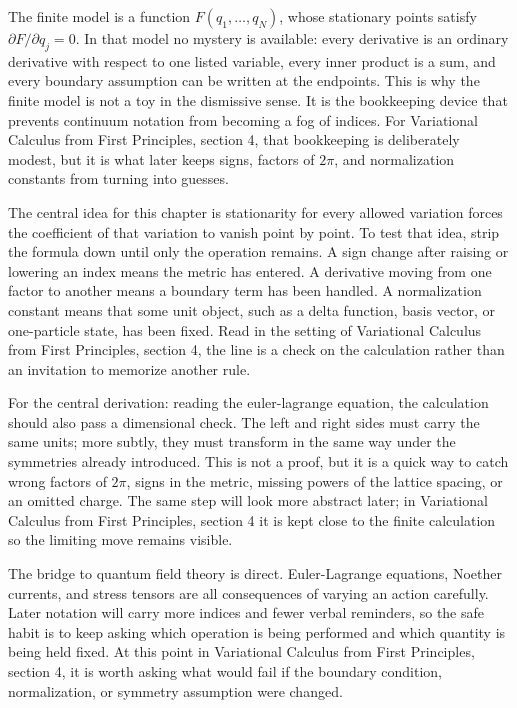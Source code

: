 The finite model is a function \(F(q_1,\ldots,q_N)\), whose stationary points satisfy \( \partial F/\partial q_j=0 \).  In that model no mystery is available: every derivative is an ordinary derivative with respect to one listed variable, every inner product is a sum, and every boundary assumption can be written at the endpoints.  This is why the finite model is not a toy in the dismissive sense.  It is the bookkeeping device that prevents continuum notation from becoming a fog of indices.  For Variational Calculus from First Principles, section 4, that bookkeeping is deliberately modest, but it is what later keeps signs, factors of \(2\pi\), and normalization constants from turning into guesses.

The central idea for this chapter is stationarity for every allowed variation forces the coefficient of that variation to vanish point by point.  To test that idea, strip the formula down until only the operation remains.  A sign change after raising or lowering an index means the metric has entered.  A derivative moving from one factor to another means a boundary term has been handled.  A normalization constant means that some unit object, such as a delta function, basis vector, or one-particle state, has been fixed.  Read in the setting of Variational Calculus from First Principles, section 4, the line is a check on the calculation rather than an invitation to memorize another rule.

For the central derivation: reading the euler-lagrange equation, the calculation should also pass a dimensional check.  The left and right sides must carry the same units; more subtly, they must transform in the same way under the symmetries already introduced.  This is not a proof, but it is a quick way to catch wrong factors of \(2\pi\), signs in the metric, missing powers of the lattice spacing, or an omitted charge.  The same step will look more abstract later; in Variational Calculus from First Principles, section 4 it is kept close to the finite calculation so the limiting move remains visible.

The bridge to quantum field theory is direct.  Euler-Lagrange equations, Noether currents, and stress tensors are all consequences of varying an action carefully.  Later notation will carry more indices and fewer verbal reminders, so the safe habit is to keep asking which operation is being performed and which quantity is being held fixed.  At this point in Variational Calculus from First Principles, section 4, it is worth asking what would fail if the boundary condition, normalization, or symmetry assumption were changed.

